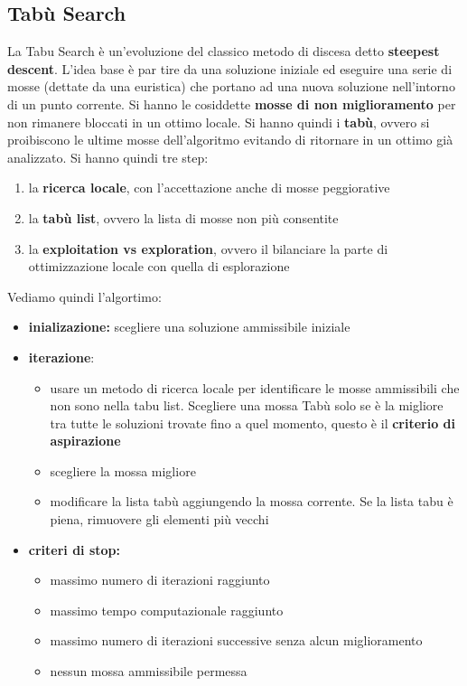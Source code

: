\documentclass[a4paper,12pt, oneside]{book}
\begin{document}
\subsection{Tabù Search}
La Tabu Search è un'evoluzione del classico metodo di discesa detto
\textbf{steepest descent}. L’idea base è par tire da una soluzione
iniziale ed eseguire una serie di mosse (dettate da una euristica) che
portano ad una nuova soluzione nell’intorno di un punto corrente. Si
hanno le cosiddette \textbf{mosse di non miglioramento} per non
rimanere bloccati in un ottimo locale. Si hanno quindi i
\textbf{tabù}, ovvero si proibiscono le ultime mosse dell'algoritmo
evitando di ritornare in un ottimo già analizzato. Si hanno quindi tre
step:
\begin{enumerate}
  \item la \textbf{ricerca locale}, con l’accettazione anche di mosse
  peggiorative
  \item la \textbf{tabù list}, ovvero la lista di mosse non più
  consentite
  \item la \textbf{exploitation vs exploration}, ovvero il bilanciare
  la parte di ottimizzazione locale con quella di esplorazione 
\end{enumerate}
Vediamo quindi l'algortimo:
\begin{itemize}
  \item \textbf{inializazione:} scegliere una soluzione ammissibile
  iniziale
  \item \textbf{iterazione}:
  \begin{itemize}
    \item usare un metodo di ricerca locale per identificare le mosse
    ammissibili che non sono nella tabu list. Scegliere una mossa Tabù
    solo se è la migliore tra tutte le soluzioni trovate fino a quel
    momento, questo è il \textbf{criterio di aspirazione}
    \item scegliere la mossa migliore
    \item modificare la lista tabù aggiungendo la mossa corrente. Se
    la lista tabu è piena, rimuovere gli elementi più vecchi 
  \end{itemize}
  \item \textbf{criteri di stop:}
  \begin{itemize}
    \item massimo numero di iterazioni raggiunto
    \item massimo tempo computazionale raggiunto
    \item massimo numero di iterazioni successive senza alcun
    miglioramento
    \item nessun mossa ammissibile permessa
  \end{itemize}
\end{itemize}
\end{document}
